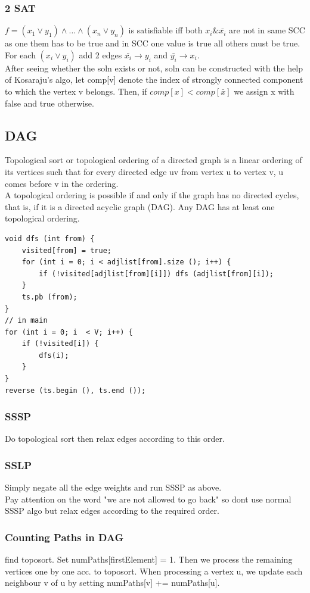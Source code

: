 \documentclass[8pt, a4paper, oneside, twocolumn]{extarticle}
\begin{document}
\subsubsection{2 SAT}
$f = (x_1 \vee y_1) \wedge \dots \wedge (x_n \vee y_n)$ is satisfiable iff both $x_i \& \bar{x_i}$ are not in same SCC as one them has to be true and in SCC one value is true all others must be true. For each $(x_i \vee y_i)$ add 2 edges $\bar{x_i} \rightarrow y_i$ and $\bar{y_i} \rightarrow x_i$. 
\\After seeing whether the soln exists or not, soln can be constructed with the help of Kosaraju's algo, let comp[v] denote the index of strongly connected component to which the vertex v belongs. Then, if $comp[x] < comp[\bar{x}]$ we assign x with false and true otherwise.
\subsection{DAG}
Topological sort or topological ordering of a directed graph is a linear ordering of its vertices such that for every directed edge uv from vertex u to vertex v, u comes before v in the ordering.
\\A topological ordering is possible if and only if the graph has no directed cycles, that is, if it is a directed acyclic graph (DAG). Any DAG has at least one topological ordering.
\begin{verbatim}
void dfs (int from) {
    visited[from] = true;
    for (int i = 0; i < adjlist[from].size (); i++) {
        if (!visited[adjlist[from][i]]) dfs (adjlist[from][i]);
    }
    ts.pb (from); 
}
// in main
for (int i = 0; i  < V; i++) {
    if (!visited[i]) {
        dfs(i);
    }
}
reverse (ts.begin (), ts.end ());
\end{verbatim}
\subsubsection{SSSP}
Do topological sort then relax edges according to this order.
\subsubsection{SSLP}
Simply negate all the edge weights and run SSSP as above.
\\Pay attention on the word "we are not allowed to go back" so dont use normal SSSP algo but relax edges according to the required order.
\subsubsection{Counting Paths in DAG}
find toposort. Set numPaths[firstElement] = 1. Then we process the remaining vertices one by one acc. to toposort. When processing a vertex u, we update each neighbour v of u by setting numPaths[v] += numPaths[u].
\end{document}
